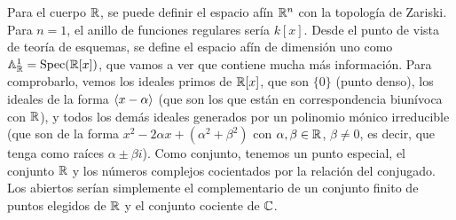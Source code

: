 \documentclass[GA.tex]{subfiles}
\begin{document}
\begin{ej}
Para el cuerpo $\mathbb{R}$, se puede definir el espacio afín $\mathbb{R}^n$ con la topología de Zariski. Para $n=1$, el anillo de funciones regulares sería $k[x]$. Desde el punto de vista de teoría de esquemas, se define el espacio afín de dimensión uno como $\mathbb{A}_{\mathbb{R}}^1=\operatorname{Spec}(\mathbb{R}[x])$, que vamos a ver que contiene mucha más información. Para comprobarlo, vemos los ideales primos de $\mathbb{R}[x]$, que son $\{0\}$ (punto denso), los ideales de la forma $\langle{x-\alpha}\rangle$ (que son los que están en correspondencia biunívoca con $\mathbb{R}$), y todos los demás ideales generados por un polinomio mónico irreducible (que son de la forma $x^2-2\alpha x+(\alpha^2+\beta^2)$ con $\alpha,\beta\in\mathbb{R}$, $\beta\neq 0$, es decir, que tenga como raíces $\alpha\pm\beta i$). Como conjunto, tenemos un punto especial, el conjunto $\mathbb{R}$ y los números complejos cocientados por la relación del conjugado. Los abiertos serían simplemente el complementario de un conjunto finito de puntos elegidos de $\mathbb{R}$ y el conjunto cociente de $\mathbb{C}$. 
\end{ej}
\end{document}
